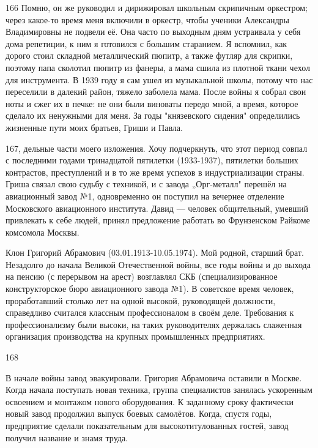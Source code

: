 166
Помню, он же руководил и дирижировал школьным скрипичным оркестром; через какое-то время меня включили в оркестр, чтобы ученики Александры Владимировны не подвели её. Она часто по выходным дням устраивала у себя дома репетиции, к ним я готовился с большим старанием.
Я вспомнил, как дорого стоил складной металлический пюпитр, а также футляр для скрипки, поэтому папа сколотил пюпитр из фанеры, а мама сшила из плотной ткани чехол для инструмента.
В 1939 году я сам ушел из музыкальной школы, потому что нас переселили в далекий район, тяжело заболела мама. После войны я собрал свои ноты и сжег их в печке: не они были виноваты передо мной, а время, которое сделало их ненужными для меня.
За годы "князевского сидения" определились жизненные пути моих братьев, Гриши и Павла.

167, дельные части моего изложения. Хочу подчеркнуть, что этот период совпал с последними годами тринадцатой пятилетки (1933-1937), пятилетки больших контрастов, преступлений и в то же время успехов в индустриализации страны. Гриша связал свою судьбу с техникой, и с завода „Орг-металл" перешёл на авиационный завод №1, одновременно он поступил на вечернее отделение Московского авиационного института. Давид — человек общительный, умевший привлекать к себе людей, принял предложение работать во Фрунзенском Райкоме комсомола Москвы.

Клон Григорий Абрамович (03.01.1913-10.05.1974). Мой родной, старший брат. Незадолго до начала Великой Отечественной войны, все годы войны и до выхода на пенсию (с перерывом на арест) возглавлял СКБ (специализированное конструкторское бюро авиационного завода №1). В советское время человек, проработавший столько лет на одной высокой, руководящей должности, справедливо считался классным профессионалом в своём деле. Требования к профессионализму были высоки, на таких руководителях держалась слаженная организация производства на крупных промышленных предприятиях.

168

В начале войны завод эвакуировали. Григория Абрамовича оставили в Москве. Когда начала поступать новая техника, группа специалистов занялась ускоренным освоением и монтажом нового оборудования. К заданному сроку фактически новый завод продолжил выпуск боевых самолётов. Когда, спустя годы, предприятие сделали показательным для высокотитулованных гостей, завод получил название и знамя труда.

